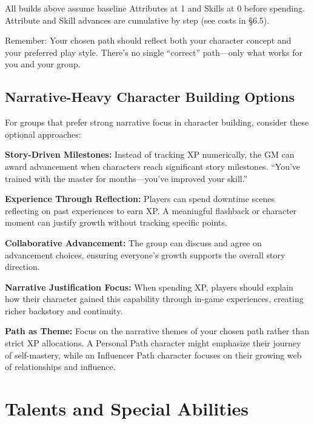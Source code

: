 \documentclass[11pt,twoside,openany]{book}
\begin{document}
\begin{tcolorbox}[colback=gray!5!white, colframe=gray!75!black, title=Reminder, fonttitle=\bfseries,breakable]
All builds above assume baseline Attributes at 1 and Skills at 0 before spending. Attribute and Skill advances are cumulative by step (see costs in §6.5).

Remember: Your chosen path should reflect both your character concept and your preferred play style. There's no single ``correct'' path---only what works for you and your group.
\end{tcolorbox}

\section*{Narrative-Heavy Character Building Options} 

For groups that prefer strong narrative focus in character building, consider these optional approaches:

\textbf{Story-Driven Milestones:} Instead of tracking XP numerically, the GM can award advancement when characters reach significant story milestones. ``You've trained with the master for months---you've improved your skill.''

\textbf{Experience Through Reflection:} Players can spend downtime scenes reflecting on past experiences to earn XP. A meaningful flashback or character moment can justify growth without tracking specific points.

\textbf{Collaborative Advancement:} The group can discuss and agree on advancement choices, ensuring everyone's growth supports the overall story direction.

\textbf{Narrative Justification Focus:} When spending XP, players should explain how their character gained this capability through in-game experiences, creating richer backstory and continuity.

\textbf{Path as Theme:} Focus on the narrative themes of your chosen path rather than strict XP allocations. A Personal Path character might emphasize their journey of self-mastery, while an Influencer Path character focuses on their growing web of relationships and influence.

\chapter{Talents and Special Abilities} \label{ch:talents}
\end{document}
